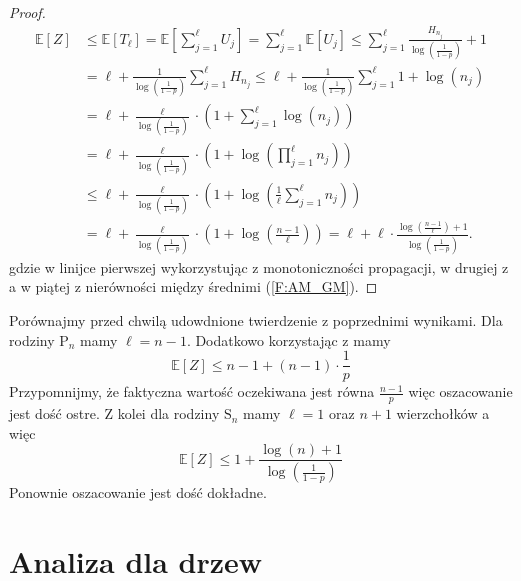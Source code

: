 \begin{proof}
\begin{equation*}
\begin{aligned}
\mathbb{E}[Z] 
&\le \mathbb{E}[T_\ell] 
  = \mathbb{E}\left[\sum_{j=1}^{\ell} U_j\right] 
  = \sum_{j=1}^{\ell} \mathbb{E}[U_j] 
  \le \sum_{j=1}^{\ell} \frac{H_{n_j}}{\log(\frac{1}{1-p})} + 1 \\
&= \ell + \frac{1}{\log(\frac{1}{1-p})} \sum_{j=1}^{\ell} H_{n_j} 
  \le \ell + \frac{1}{\log(\frac{1}{1-p})} \sum_{j=1}^{\ell} 1 + \log(n_j) \\
&= \ell + \frac{\ell}{\log(\frac{1}{1-p})} \cdot \left(1 + \sum_{j=1}^{\ell} \log(n_j) \right) \\
&= \ell + \frac{\ell}{\log(\frac{1}{1-p})} \cdot \left(1 + \log \left(\prod_{j=1}^{\ell} n_j\right)\right) \\
&\le \ell + \frac{\ell}{\log(\frac{1}{1-p})} \cdot \left(1 + \log \left(\frac{1}{\ell} \sum_{j=1}^{\ell} n_j\right) \right) \\
&= \ell + \frac{\ell}{\log(\frac{1}{1-p})} \cdot \left(1 + \log \left(\frac{n-1}{\ell}\right) \right) = \ell  + \ell \cdot \frac{\log(\frac{n-1}{\ell}) + 1}{\log(\frac{1}{1-p})}.
\end{aligned}
\end{equation*}
gdzie w linijce pierwszej wykorzystując z monotoniczności propagacji, w drugiej z  a w piątej z nierówności między średnimi (\ref{F:AM_GM}).
\end{proof}

Porównajmy przed chwilą udowdnione twierdzenie z poprzednimi wynikami. Dla rodziny $\mathrm{P}_n$ mamy $\ell = n - 1$. Dodatkowo korzystając z  mamy
\[
    \mathbb{E}[Z] \le n-1 + (n-1) \cdot \frac{1}{p}
\]
Przypomnijmy, że faktyczna wartość oczekiwana jest równa $\frac{n-1}{p}$ więc oszacowanie jest dość ostre. 
Z kolei dla rodziny $\mathrm{S}_n$ mamy $\ell=1$ oraz $n+1$ wierzchołków a więc
\[
    \mathbb{E}[Z] \le 1 + \frac{\log(n) + 1}{\log(\frac{1}{1-p})}
\]
Ponownie oszacowanie jest dość dokładne.


\section{Analiza dla drzew}


